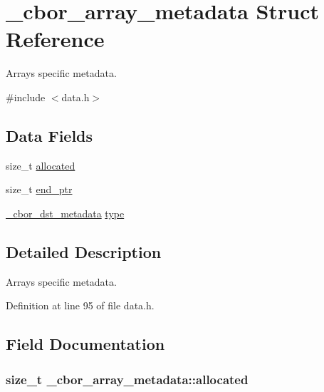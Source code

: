 \hypertarget{struct__cbor__array__metadata}{\section{\-\_\-cbor\-\_\-array\-\_\-metadata Struct Reference}
\label{struct__cbor__array__metadata}
}


Arrays specific metadata.  




{\ttfamily \#include $<$data.\-h$>$}

\subsection*{Data Fields}
\begin{DoxyCompactItemize}
\item 
size\-\_\-t \hyperlink{struct__cbor__array__metadata_ad59631add7d960a0777686c8cc0fd46a}{allocated}
\item 
size\-\_\-t \hyperlink{struct__cbor__array__metadata_a388742d0b665ba1775ad89858f3049cb}{end\-\_\-ptr}
\item 
\hyperlink{data_8h_a3cdab5e05cf46846e98b43cf77985589}{\-\_\-cbor\-\_\-dst\-\_\-metadata} \hyperlink{struct__cbor__array__metadata_a0c376239d3aafcfe64ee7c74fd422f37}{type}
\end{DoxyCompactItemize}


\subsection{Detailed Description}
Arrays specific metadata. 

Definition at line 95 of file data.\-h.



\subsection{Field Documentation}
\hypertarget{struct__cbor__array__metadata_ad59631add7d960a0777686c8cc0fd46a}{
\subsubsection[{allocated}]{\setlength{\rightskip}{0pt plus 5cm}size\-\_\-t \-\_\-cbor\-\_\-array\-\_\-metadata\-::allocated}}\label{struct__cbor__array__metadata_ad59631add7d960a0777686c8cc0fd46a}


